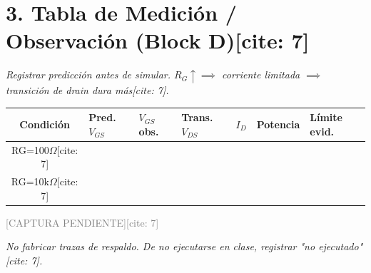 \documentclass[11pt, a4paper]{article}
\begin{document}
\section*{3. Tabla de Medición / Observación (Block D)[cite: 7]}
\textit{Registrar predicción antes de simular. $R_G \uparrow \implies$ corriente limitada $\implies$ transición de drain dura más[cite: 7].}

\vspace{0.3cm}
\renewcommand{\arraystretch}{1.5}
{\footnotesize %
\noindent
\begin{tabularx}{\textwidth}{|c|>{\raggedright\arraybackslash}X|>{\raggedright\arraybackslash}X|>{\raggedright\arraybackslash}X|>{\raggedright\arraybackslash}X|>{\raggedright\arraybackslash}X|>{\raggedright\arraybackslash}X|}
\hline
\textbf{Condición} & \textbf{Pred. $V_{GS}$} & \textbf{$V_{GS}$ obs.} & \textbf{Trans. $V_{DS}$} & \textbf{$I_D$} & \textbf{Potencia} & \textbf{Límite evid.} \\ \hline
RG=100$\Omega$[cite: 7] & & & & & & \\ \hline
RG=10k$\Omega$[cite: 7] & & & & & & \\ \hline
\end{tabularx}
}

\vspace{0.8cm}
\begin{tcolorbox}[colback=white, colframe=black, title=\textbf{Evidencia de Trazas LTspice (V5) {[cite: 7]}}]
    \centering
    \vspace{2cm}
    \Huge \textcolor{gray}{[CAPTURA PENDIENTE][cite: 7]}
    \vspace{2cm}
\end{tcolorbox}
\textit{No fabricar trazas de respaldo. De no ejecutarse en clase, registrar "no ejecutado"[cite: 7].}
\end{document}
